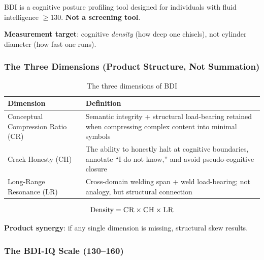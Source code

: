 \documentclass[11pt,a4paper]{article}
\theoremstyle{definition}
\theoremstyle{plain}
\newcommand{\BDI}{\textsc{BDI}}
\newcommand{\CR}{\textsc{CR}}
\newcommand{\CH}{\textsc{CH}}
\newcommand{\LR}{\textsc{LR}}
\begin{document}
\BDI{} is a cognitive posture profiling tool designed for individuals with fluid intelligence $\geq$130. \textbf{Not a screening tool}.

\textbf{Measurement target}: cognitive \textit{density} (how deep one chisels), not cylinder diameter (how fast one runs).

\subsubsection{The Three Dimensions (Product Structure, Not Summation)}

\begin{table}[htbp]
\centering
\caption{The three dimensions of \BDI{}}
\label{tab:dimensions}
\begin{tabular}{@{}lp{8cm}@{}}
\toprule
\textbf{Dimension} & \textbf{Definition} \\
\midrule
Conceptual Compression Ratio (\CR{}) & Semantic integrity + structural load-bearing retained when compressing complex content into minimal symbols \\
Crack Honesty (\CH{}) & The ability to honestly halt at cognitive boundaries, annotate ``I do not know,'' and avoid pseudo-cognitive closure \\
Long-Range Resonance (\LR{}) & Cross-domain welding span + weld load-bearing; not analogy, but structural connection \\
\bottomrule
\end{tabular}
\end{table}

\begin{equation}
\text{Density} = \CR{} \times \CH{} \times \LR{}
\end{equation}

\textbf{Product synergy}: if any single dimension is missing, structural skew results.

\subsubsection{The \BDI{}-IQ Scale (130--160)}
\end{document}
